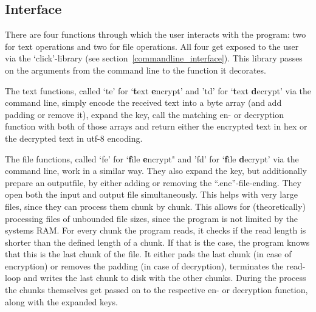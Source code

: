 \hypertarget{interface}{%
\subsection{Interface}\label{interface}}

There are four functions through which the user interacts with the
program: two for text operations and two for file operations. All four
get exposed to the user via the `click'-library (see section~\ref{commandline_interface}). This library passes on the arguments
from the command line to the function it decorates.

The text functions, called `te' for `\textbf{t}ext \textbf{e}ncrypt' and
'td' for `\textbf{t}ext \textbf{d}ecrypt' via the command line, simply
encode the received text into a byte array (and add padding or remove
it), expand the key, call the matching en- or decryption function with
both of those arrays and return either the encrypted text in hex or the
decrypted text in utf-8 encoding.

The file functions, called `fe' for `\textbf{f}ile \textbf{e}ncrypt" and
'fd' for `\textbf{f}ile \textbf{d}ecrypt' via the command line, work in
a similar way. They also expand the key, but additionally prepare an
outputfile, by either adding or removing the ``.enc''-file-ending. They
open both the input and output file simultaneously. This helps with very
large files, since they can process them chunk by chunk. This allows for
(theoretically) processing files of unbounded file sizes, since the
program is not limited by the systems RAM. For every chunk the program
reads, it checks if the read length is shorter than the defined length
of a chunk. If that is the case, the program knows that this is the
last chunk of the file. It either pads the last chunk (in case of
encryption) or removes the padding (in case of decryption), terminates
the read-loop and writes the last chunk to disk with the other chunks. During the
process the chunks themselves get passed on to the respective en- or
decryption function, along with the expanded keys.
